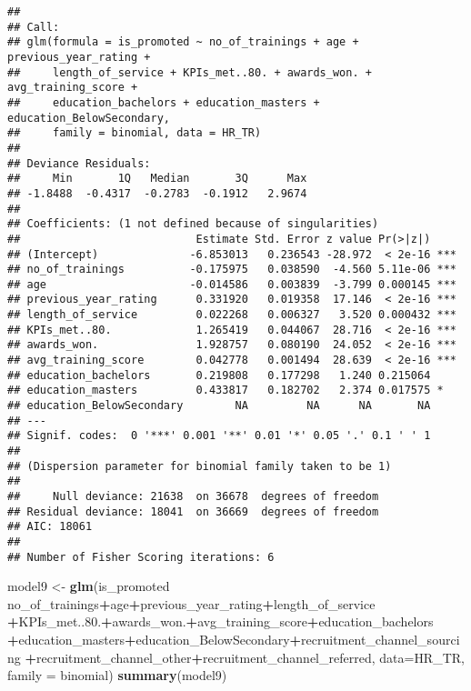 \documentclass[
]{article}
\newenvironment{Shaded}{\begin{snugshade}}{\end{snugshade}}
\newcommand{\DataTypeTok}[1]{\textcolor[rgb]{0.13,0.29,0.53}{#1}}
\newcommand{\FloatTok}[1]{\textcolor[rgb]{0.00,0.00,0.81}{#1}}
\newcommand{\KeywordTok}[1]{\textcolor[rgb]{0.13,0.29,0.53}{\textbf{#1}}}
\newcommand{\NormalTok}[1]{#1}
\newcommand{\OperatorTok}[1]{\textcolor[rgb]{0.81,0.36,0.00}{\textbf{#1}}}
\newcommand{\StringTok}[1]{\textcolor[rgb]{0.31,0.60,0.02}{#1}}
\begin{document}
\begin{verbatim}
## 
## Call:
## glm(formula = is_promoted ~ no_of_trainings + age + previous_year_rating + 
##     length_of_service + KPIs_met..80. + awards_won. + avg_training_score + 
##     education_bachelors + education_masters + education_BelowSecondary, 
##     family = binomial, data = HR_TR)
## 
## Deviance Residuals: 
##     Min       1Q   Median       3Q      Max  
## -1.8488  -0.4317  -0.2783  -0.1912   2.9674  
## 
## Coefficients: (1 not defined because of singularities)
##                           Estimate Std. Error z value Pr(>|z|)    
## (Intercept)              -6.853013   0.236543 -28.972  < 2e-16 ***
## no_of_trainings          -0.175975   0.038590  -4.560 5.11e-06 ***
## age                      -0.014586   0.003839  -3.799 0.000145 ***
## previous_year_rating      0.331920   0.019358  17.146  < 2e-16 ***
## length_of_service         0.022268   0.006327   3.520 0.000432 ***
## KPIs_met..80.             1.265419   0.044067  28.716  < 2e-16 ***
## awards_won.               1.928757   0.080190  24.052  < 2e-16 ***
## avg_training_score        0.042778   0.001494  28.639  < 2e-16 ***
## education_bachelors       0.219808   0.177298   1.240 0.215064    
## education_masters         0.433817   0.182702   2.374 0.017575 *  
## education_BelowSecondary        NA         NA      NA       NA    
## ---
## Signif. codes:  0 '***' 0.001 '**' 0.01 '*' 0.05 '.' 0.1 ' ' 1
## 
## (Dispersion parameter for binomial family taken to be 1)
## 
##     Null deviance: 21638  on 36678  degrees of freedom
## Residual deviance: 18041  on 36669  degrees of freedom
## AIC: 18061
## 
## Number of Fisher Scoring iterations: 6
\end{verbatim}

\begin{Shaded}
\begin{Highlighting}[]
\NormalTok{model9 <-}\StringTok{ }\KeywordTok{glm}\NormalTok{(is_promoted }\OperatorTok{~}\StringTok{ }\NormalTok{no_of_trainings}\OperatorTok{+}\NormalTok{age}\OperatorTok{+}\NormalTok{previous_year_rating}\OperatorTok{+}\NormalTok{length_of_service}
              \OperatorTok{+}\NormalTok{KPIs_met..}\FloatTok{80.}\OperatorTok{+}\NormalTok{awards_won.}\OperatorTok{+}\NormalTok{avg_training_score}\OperatorTok{+}\NormalTok{education_bachelors}
              \OperatorTok{+}\NormalTok{education_masters}\OperatorTok{+}\NormalTok{education_BelowSecondary}\OperatorTok{+}\NormalTok{recruitment_channel_sourcing}
              \OperatorTok{+}\NormalTok{recruitment_channel_other}\OperatorTok{+}\NormalTok{recruitment_channel_referred, }
              \DataTypeTok{data=}\NormalTok{HR_TR, }\DataTypeTok{family =}\NormalTok{ binomial)}
\KeywordTok{summary}\NormalTok{(model9)}
\end{Highlighting}
\end{Shaded}
\end{document}
